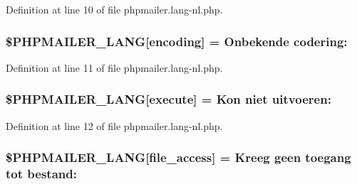 Definition at line 10 of file phpmailer.\+lang-\/nl.\+php.

\subsubsection[{\texorpdfstring{\$\+P\+H\+P\+M\+A\+I\+L\+E\+R\+\_\+\+L\+A\+NG}{$PHPMAILER_LANG}}]{\setlength{\rightskip}{0pt plus 5cm}\$P\+H\+P\+M\+A\+I\+L\+E\+R\+\_\+\+L\+A\+NG\mbox{[}\textquotesingle{}encoding\textquotesingle{}\mbox{]} = \textquotesingle{}Onbekende codering\+: \textquotesingle{}}\hypertarget{phpmailer_8lang-nl_8php_a817f7283f3d54c970a0c10305cc668cc}{}\label{phpmailer_8lang-nl_8php_a817f7283f3d54c970a0c10305cc668cc}


Definition at line 11 of file phpmailer.\+lang-\/nl.\+php.

\subsubsection[{\texorpdfstring{\$\+P\+H\+P\+M\+A\+I\+L\+E\+R\+\_\+\+L\+A\+NG}{$PHPMAILER_LANG}}]{\setlength{\rightskip}{0pt plus 5cm}\$P\+H\+P\+M\+A\+I\+L\+E\+R\+\_\+\+L\+A\+NG\mbox{[}\textquotesingle{}execute\textquotesingle{}\mbox{]} = \textquotesingle{}Kon niet uitvoeren\+: \textquotesingle{}}\hypertarget{phpmailer_8lang-nl_8php_a668217a9563a168f30f2a8548b6ed5a9}{}\label{phpmailer_8lang-nl_8php_a668217a9563a168f30f2a8548b6ed5a9}


Definition at line 12 of file phpmailer.\+lang-\/nl.\+php.

\subsubsection[{\texorpdfstring{\$\+P\+H\+P\+M\+A\+I\+L\+E\+R\+\_\+\+L\+A\+NG}{$PHPMAILER_LANG}}]{\setlength{\rightskip}{0pt plus 5cm}\$P\+H\+P\+M\+A\+I\+L\+E\+R\+\_\+\+L\+A\+NG\mbox{[}\textquotesingle{}file\+\_\+access\textquotesingle{}\mbox{]} = \textquotesingle{}Kreeg geen toegang tot bestand\+: \textquotesingle{}}\hypertarget{phpmailer_8lang-nl_8php_a7e83349023b856ef9e5c46e30ae6d51e}{}\label{phpmailer_8lang-nl_8php_a7e83349023b856ef9e5c46e30ae6d51e}


